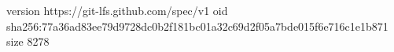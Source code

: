 version https://git-lfs.github.com/spec/v1
oid sha256:77a36ad83ee79d9728dc0b2f181bc01a32c69d2f05a7bde015f6e716c1e1b871
size 8278
